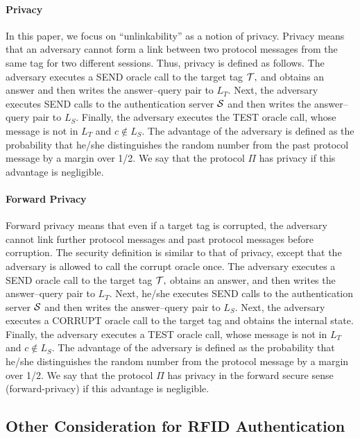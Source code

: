 \documentclass[english]{llncs}
\begin{document}
\paragraph{Privacy}

In this paper, we focus on {}``unlinkability'' as a notion of privacy.
Privacy means that an adversary cannot form a link between two protocol
messages from the same tag for two different sessions. Thus, privacy
is defined as follows. The adversary executes a SEND oracle call to
the target tag ${\cal {T},}$ and obtains an answer and then writes
the answer--query pair to $L_{T}$. Next, the adversary executes SEND
calls to the authentication server ${\cal {S}}$ and then writes the
answer--query pair to $L_{S}$. Finally, the adversary executes the
TEST oracle call, whose message is not in $L_{T}$ and $c\notin L_{S}$.
The advantage of the adversary is defined as the probability that
he/she distinguishes the random number from the past protocol message
by a margin over 1/2. We say that the protocol $\Pi$ has privacy
if this advantage is negligible.


\paragraph{Forward Privacy}

Forward privacy means that even if a target tag is corrupted, the
adversary cannot link further protocol messages and past protocol
messages before corruption. The security definition is similar to
that of privacy, except that the adversary is allowed to call the
corrupt oracle once. The adversary executes a SEND oracle call to
the target tag ${\cal {T}},$ obtains an answer, and then writes the
answer--query pair to $L_{T}$. Next, he/she executes SEND calls to
the authentication server ${\cal {S}}$ and then writes the answer--query
pair to $L_{S}$. Next, the adversary executes a CORRUPT oracle call
to the target tag and obtains the internal state.
Finally, the adversary executes a TEST oracle call, whose message
is not in $L_{T}$ and $c\notin L_{S}$. The advantage of the adversary
is defined as the probability that he/she distinguishes the random
number from the protocol message by a margin over 1/2. We say that
the protocol $\Pi$ has privacy in the forward secure sense 
(forward-privacy)
if this
advantage is negligible.


\subsection{Other Consideration for RFID Authentication}
\end{document}
